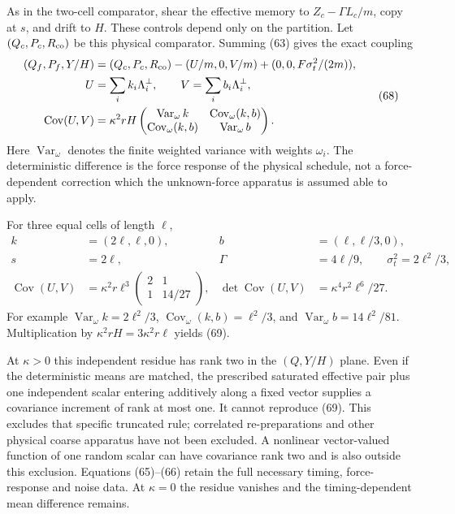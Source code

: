 \documentclass[11pt,a4paper]{article}
\begin{document}
As in the two-cell comparator, shear the effective memory to
\(Z_c-\Gamma L_c/m\), copy at \(s\), and drift to \(H\). These controls
depend only on the partition. Let \((Q_c,P_c,R_{\rm co})\) be this
physical comparator. Summing (63) gives the exact coupling
\[\begin{aligned}
(Q_f,P_f,Y/H)
 &=(Q_c,P_c,R_{\rm co})-(U/m,0,V/m)
                         +(0,0,F\sigma_t^2/(2m)),\\
U&=\sum_i k_i\Lambda_i^\perp,\qquad
V=\sum_i b_i\Lambda_i^\perp,\\
\operatorname{Cov}(U,V)
 &=\kappa^2rH
 \begin{pmatrix}
 \operatorname{Var}_\omega k&\operatorname{Cov}_\omega(k,b)\\
 \operatorname{Cov}_\omega(k,b)&\operatorname{Var}_\omega b
 \end{pmatrix}.
\end{aligned}\tag{68}\] Here \(\operatorname{Var}_\omega\) denotes the
finite weighted variance with weights \(\omega_i\). The deterministic
difference is the force response of the physical schedule, not a
force-dependent correction which the unknown-force apparatus is assumed
able to apply.

For three equal cells of length \(\ell\), \[\begin{aligned}
k&=(2\ell,\ell,0),&b&=(\ell,\ell/3,0),\\
s&=2\ell,&\Gamma&=4\ell/9,\qquad\sigma_t^2=2\ell^2/3,\\
\operatorname{Cov}(U,V)
 &=\kappa^2r\ell^3
       \begin{pmatrix}2&1\\1&14/27\end{pmatrix},&
\det\operatorname{Cov}(U,V)&=\kappa^4r^2\ell^6/27.
\end{aligned}\tag{69}\] For example
\(\operatorname{Var}_\omega k=2\ell^2/3\),
\(\operatorname{Cov}_\omega(k,b)=\ell^2/3\), and
\(\operatorname{Var}_\omega b=14\ell^2/81\). Multiplication by
\(\kappa^2rH=3\kappa^2r\ell\) yields (69).

At \(\kappa>0\) this independent residue has rank two in the \((Q,Y/H)\)
plane. Even if the deterministic means are matched, the prescribed
saturated effective pair plus one independent scalar entering additively
along a fixed vector supplies a covariance increment of rank at most
one. It cannot reproduce (69). This excludes that specific truncated
rule; correlated re-preparations and other physical coarse apparatus
have not been excluded. A nonlinear vector-valued function of one random
scalar can have covariance rank two and is also outside this exclusion.
Equations (65)--(66) retain the full necessary timing, force-response
and noise data. At \(\kappa=0\) the residue vanishes and the
timing-dependent mean difference remains.
\end{document}
